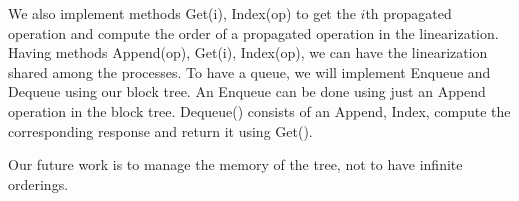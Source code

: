 \documentclass[12pt]{article}
\begin{document}
We also implement methods Get(i), Index(op) to get the $i$th propagated operation and compute the order of a propagated operation in the linearization. Having methods Append(op), Get(i), Index(op), we can have the linearization shared among the processes. To have a queue, we will implement Enqueue and Dequeue using our block tree. An Enqueue can be done using just an Append operation in the block tree. Dequeue() consists of an Append, Index, compute the corresponding response and return it using Get().

Our future work is to manage the memory of the tree, not to have infinite orderings.



 

\end{document}
